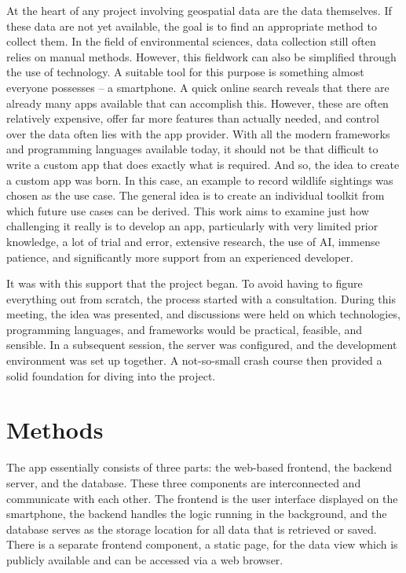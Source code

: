 \documentclass{josis}
\begin{document}
At the heart of any project involving geospatial data are the data themselves. If these data are not yet available, 
the goal is to find an appropriate method to collect them. In the field of environmental sciences, 
data collection still often relies on manual methods. However, this fieldwork can also be simplified through the use of technology. 
A suitable tool for this purpose is something almost everyone possesses -- a smartphone.
A quick online search reveals that there are already many apps available that can accomplish this. 
However, these are often relatively expensive, offer far more features than actually needed, 
and control over the data often lies with the app provider. With all the modern frameworks 
and programming languages available today, it should not be that difficult to write a 
custom app that does exactly what is required.
And so, the idea to create a custom app was born.
In this case, an example to record wildlife sightings was chosen as the use case.
The general idea is to create an individual toolkit from which future use cases can be derived. 
This work aims to examine just how challenging it really is to develop an app, 
particularly with very limited prior knowledge, a lot of trial and error, 
extensive research, the use of AI, immense patience, 
and significantly more support from an experienced developer.

It was with this support that the project began. To avoid having to figure everything out from scratch, 
the process started with a consultation. During this meeting, the idea was presented, 
and discussions were held on which technologies, programming languages, 
and frameworks would be practical, feasible, and sensible. 
In a subsequent session, the server was configured, and the development environment was set up together. 
A not-so-small crash course then provided a solid foundation for diving into the project.

\section{Methods}

The app essentially consists of three parts: the web-based frontend, the backend server, 
and the database. These three components are interconnected and communicate with each other. 
The frontend is the user interface displayed on the smartphone, 
the backend handles the logic running in the background, 
and the database serves as the storage location for all data that is retrieved or saved.
There is a separate frontend component, a static page,
for the data view which is publicly available and can be accessed via a web browser.
\end{document}
